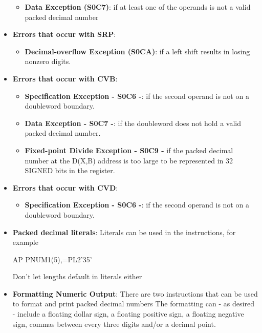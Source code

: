 \documentclass{report}
\begin{document}
\begin{itemize}
\begin{itemize}
                \item \textbf{Data Exception (S0C7)}: if at least one of the operands is not a valid packed decimal number 
            \end{itemize}
        \item \textbf{Errors that occur with SRP}: 
            \begin{itemize}
                \item \textbf{Decimal-overflow Exception  (S0CA)}: if a left shift results in losing nonzero digits.
            \end{itemize}
        \item \textbf{Errors that occur with CVB}: 
            \begin{itemize}
                \item \textbf{Specification Exception - S0C6 -}: if the second operand is not on a doubleword boundary.
                \item \textbf{Data Exception - S0C7 -}: if the doubleword does not hold a valid packed decimal number.
                \item \textbf{Fixed-point Divide Exception - S0C9 -} if the packed decimal number at the D(X,B) address is too large to be represented in 32 SIGNED bits in the register.
            \end{itemize}
        \item \textbf{Errors that occur with CVD}: 
            \begin{itemize}
                \item \textbf{Specification Exception - S0C6 -}: if the second operand is not on a doubleword boundary.
            \end{itemize}
        \item \textbf{Packed decimal literals}: Literals can be used in the instructions, for example
            \bigbreak \noindent 
            \begin{cppcode}
            AP PNUM1(5),=PL2'35'
            \end{cppcode}
            \bigbreak \noindent 
            Don't let lengths default in literals either
        \item \textbf{Formatting Numeric Output}: There are two instructions that can be used to format and print packed decimal numbers
            \bigbreak \noindent 
            The formatting can - as desired - include a floating dollar sign, a floating positive sign, a floating negative sign, commas between every three digits and/or a decimal point.

\end{itemize}
\end{document}
